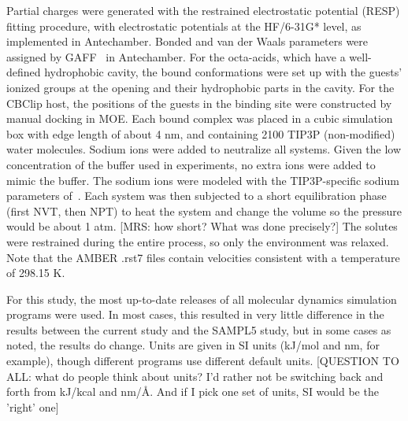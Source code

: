 Partial charges were generated with the restrained electrostatic
potential (RESP) fitting procedure, with electrostatic potentials at
the HF/6-31G* level, as implemented in Antechamber.  Bonded and van
der Waals parameters were assigned by GAFF~\citep{wang_development_2004} in Antechamber. For the
octa-acids, which have a well-defined hydrophobic cavity, the bound
conformations were set up with the guests' ionized groups at the
opening and their hydrophobic parts in the cavity. For the CBClip
host, the positions of the guests in the binding site were constructed
by manual docking in MOE.  Each bound complex was placed in a cubic
simulation box with edge length of about 4 nm, and containing 2100
TIP3P (non-modified) water molecules. Sodium ions were added to
neutralize all systems. Given the low concentration of the buffer used
in experiments, no extra ions were added to mimic the buffer. The
sodium ions were modeled with the TIP3P-specific sodium parameters
of~\citep{Joung2008}. Each system was then subjected to a short equilibration
phase (first NVT, then NPT) to heat the system and change the volume
so the pressure would be about 1 atm. [MRS: how short? What was done
  precisely?] The solutes were restrained during the entire process,
so only the environment was relaxed. Note that the AMBER .rst7 files
contain velocities consistent with a temperature of 298.15 K.

For this study, the most up-to-date releases of all molecular dynamics
simulation programs were used. In most cases, this resulted in very
little difference in the results between the current study and the
SAMPL5 study, but in some cases as noted, the results do change. Units
are given in SI units (kJ/mol and nm, for example), though different
programs use different default units. [QUESTION TO ALL: what do people
  think about units? I'd rather not be switching back and forth from
  kJ/kcal and nm/\AA. And if I pick one set of units, SI would be the
  'right' one]

